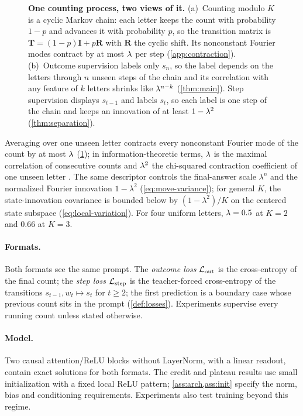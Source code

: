 \begin{figure}[t]
\centering
\resizebox{\linewidth}{!}{}
\caption{\textbf{One counting process, two views of it.}
(a)~Counting modulo $K$ is a cyclic Markov chain: each letter keeps the count with probability $1-p$ and advances it with probability
$p$, so the transition matrix is $\mathbf T=(1-p)\mathbf I+p\mathbf R$ with $\mathbf R$ the cyclic shift. Its nonconstant Fourier modes
contract by at most $\lambda$ per step (\cref{app:contraction}).
(b)~Outcome supervision labels only $s_n$, so the label depends on the letters through $n$ unseen steps of the chain and its
correlation with any feature of $k$ letters shrinks like $\lambda^{n-k}$ (\cref{thm:main}). Step supervision displays $s_{t-1}$ and labels $s_t$, so each label is one
step of the chain and keeps an innovation of at least $1-\lambda^2$ (\cref{thm:separation}).}
\label{fig:chain}
\end{figure}

Averaging over one unseen letter contracts every nonconstant Fourier mode of the count by at most $\lambda$ (\cref{fig:chain}); in information-theoretic terms,
$\lambda$ is the maximal correlation of consecutive counts and $\lambda^2$ the chi-squared contraction coefficient of one
unseen letter \citep{witsenhausen1975sequences,raginsky2016strong}.
The same descriptor controls the final-answer scale $\lambda^n$ and the
normalized Fourier innovation $1-\lambda^2$ (\cref{eq:move-variance}); for general
$K$, the state-innovation covariance is bounded below by
$(1-\lambda^2)/K$ on the centered state subspace (\cref{eq:local-variation}).
For four uniform letters,
$\lambda=0.5$ at $K=2$ and $0.66$ at $K=3$.

\paragraph{Formats.} Both formats see the same prompt. The \emph{outcome loss} $\mathcal L_{\mathrm{out}}$ is the cross-entropy of the final
count; the \emph{step loss} $\mathcal L_{\mathrm{step}}$ is the teacher-forced cross-entropy of the transitions $s_{t-1},w_t\mapsto s_t$ for
$t\ge2$; the first prediction is a boundary case whose previous count sits in the prompt (\cref{def:losses}). Experiments
supervise every running count unless stated otherwise.

\paragraph{Model.} Two causal attention/ReLU blocks without LayerNorm, with a linear readout,
contain exact solutions for both formats. The credit and plateau results use small initialization
with a fixed local ReLU pattern; \cref{ass:arch,ass:init} specify the norm, bias and conditioning
requirements. Experiments also test training beyond this regime.

